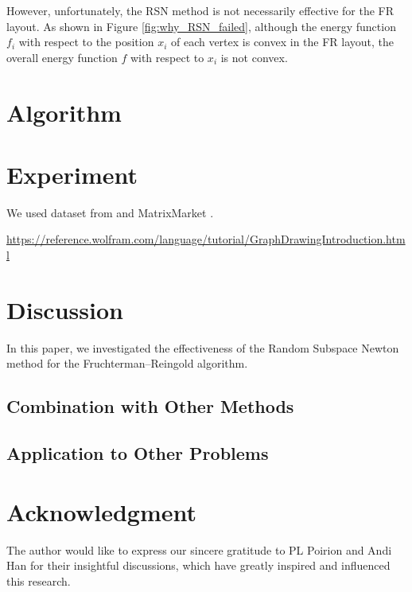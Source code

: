 \documentclass[dvipdfmx,journal]{IEEEtran}
\begin{document}
However, unfortunately, the RSN method is not necessarily effective for the FR layout.
As shown in Figure \ref{fig:why_RSN_failed}, although the energy function \( f_i \) with respect to the position \( x_i \) of each vertex is convex in the FR layout, the overall energy function \( f \) with respect to \( x_i \) is not convex.

\section{Algorithm} \label{sec:algorithm}


\section{Experiment} \label{sec:experiment}

We used dataset from \cite{davis2011university} and MatrixMarket \cite{boisvertMatrixMarketWeb1997}.

\url{https://reference.wolfram.com/language/tutorial/GraphDrawingIntroduction.html}

\section{Discussion} \label{sec:discussion}

In this paper, we investigated the effectiveness of the Random Subspace Newton method for the Fruchterman--Reingold algorithm.

\subsection{Combination with Other Methods}



\subsection{Application to Other Problems}



\section{Acknowledgment}

The author would like to express our sincere gratitude to PL Poirion and Andi Han for their insightful discussions, which have greatly inspired and influenced this research.

\end{document}

